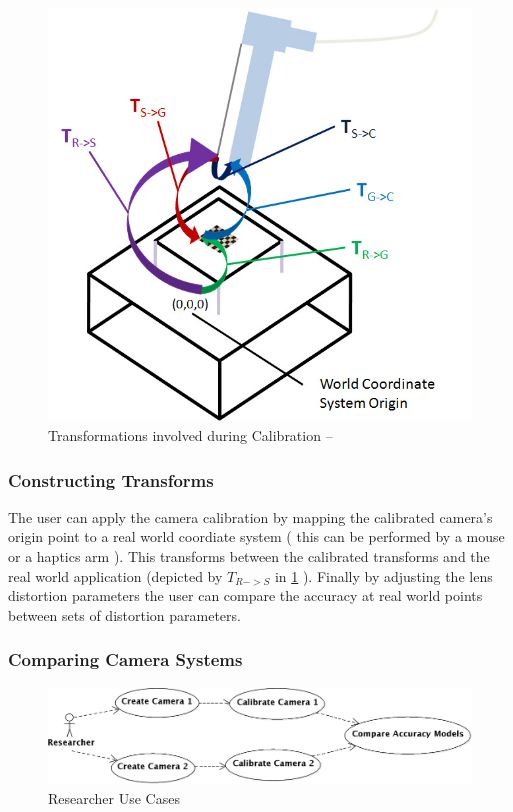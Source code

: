 \documentclass[11pt]{report}
\begin{document}
\begin{figure}[htp]
\centering
\includegraphics[scale=0.45]{images/Coordinates.png}
\caption{Transformations involved during Calibration --\cite{CC}}
\label{fig:coord}
\end{figure}

\subsubsection{Constructing Transforms}
The user can apply the camera calibration by mapping the calibrated camera's origin point to a real world coordiate system ( this can be performed by a mouse or a haptics arm ). 
This transforms between the calibrated transforms and the real world application (depicted by \( T_{R->S} \) in \ref{fig:coord} ). Finally by adjusting the lens distortion parameters the user can compare the accuracy at real world points between sets of distortion parameters.  

\subsubsection{Comparing Camera Systems} 

\begin{figure}[htp]
\centering
\includegraphics[scale=0.15]{images/CompareCameras.png}
\caption{Researcher Use Cases}
\label{fig:ucc}
\end{figure}
\end{document}

